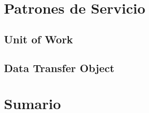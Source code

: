 \documentclass[a4paper,slidestop,xcolor=pst,blue]{beamer}
\begin{document}
\section{Patrones de Servicio}

\subsection{Unit of Work}

\subsection{Data Transfer Object}

\section{Sumario}
\end{document}
